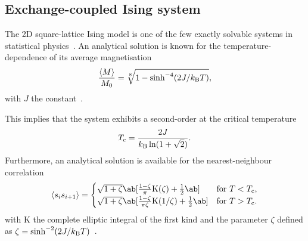 \vspace{-1em}

\subsection{Exchange-coupled Ising system}\label{sec:2:Verification_OOP_Exchange}
The 2D square-lattice  Ising model is one of the few exactly solvable systems in statistical physics~\cite{ExactlySolvedModelsStatMech}.
An analytical solution is known for the temperature-dependence of its average magnetisation
\begin{equation}
	\label{eq:2:Verification_exchange_M}
	\frac{\langle M \rangle}{M_0} = \sqrt[8]{1 - \sinh^{-4}(2J/\kBT)} \mathrm{,}
\end{equation}
with $J$ the  constant~\cite{Correlations2DIsing,IsingSpontaneousMagnetization,coey2010magnetism}. \par
This implies that the system exhibits a second-order  at the critical temperature~\cite{ExactlySolvedModelsStatMech}
\begin{equation}
	T_\mathrm{c} = \frac{2J}{\kB \ln(1 + \sqrt{2})} \mathrm{.}
\end{equation}
Furthermore, an analytical solution is available for the nearest-neighbour correlation
\begin{equation}
	\label{eq:2:Verification_exchange_corr}
	\langle s_i s_{i+1} \rangle = 
	\begin{cases}
		\sqrt{1+\zeta} \ab[\frac{1-\zeta}{\pi}\mathrm{K}(\zeta) + \frac{1}{2} \ab] &\text{for } T < T_\mathrm{c} \mathrm{,} \\ 
		\sqrt{1+\zeta} \ab[\frac{1-\zeta}{\pi \zeta}\mathrm{K}(1/\zeta) + \frac{1}{2} \ab] &\text{for } T > T_\mathrm{c} \mathrm{.} \\ 
	\end{cases}
\end{equation}
with $\mathrm{K}$ the complete elliptic integral of the first kind and the parameter $\zeta$ defined as $\zeta=\sinh^{-2}(2J/\kBT)$~\cite{Correlations2DIsing}. \\\par

